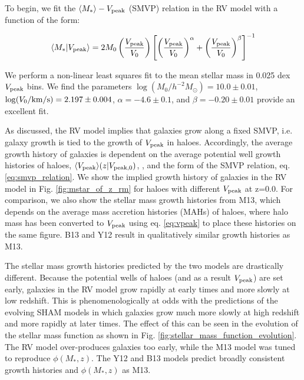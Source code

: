 \documentclass[a4paper,fleqn,usenatbib]{mnras}
\begin{document}
To begin, we fit the $\langle M_* \rangle - V_{\rm peak}$ (SMVP) relation in the RV model with a function of the form:
%
\begin{linenomath}
\begin{equation}
\label{eq:smvp_relation}
\langle M_* | V_{\rm peak} \rangle = 2M_0\left(\frac{V_{\rm peak}}{V_0}\right)\left[\left(\frac{V_{\rm peak}}{V_0}\right)^{\alpha}+\left(\frac{V_{\rm peak}}{V_0}\right)^{\beta}\right]^{-1}
\end{equation}
\end{linenomath}
%
We perform a non-linear least squares fit to the mean stellar mass in 0.025 dex $V_{\rm peak}$ bins.  We find the parameters $\log(M_0/h^{-2}M_{\odot})=10.0 \pm 0.01$, $\log(V_0/{\rm km/s})=2.197 \pm 0.004$, $\alpha=-4.6 \pm 0.1$, and $\beta=-0.20 \pm 0.01$ provide an excellent fit.

As discussed, the RV model implies that galaxies grow along a fixed SMVP, i.e. galaxy growth is tied to the growth of $V_{\rm peak}$ in haloes.  Accordingly, the average growth history of galaxies is dependent on the average potential well growth histories of haloes, $\langle V_{\rm peak} \rangle (z | V_{\rm peak, 0})$, \citep[PWGHs,][]{Bosch:2014cu}, and the form of the SMVP relation, eq. \ref{eq:smvp_relation}.  We show the implied growth history of galaxies in the RV model in Fig. \ref{fig:mstar_of_z_rm} for haloes with different $V_{\rm peak}$ at z=0.0.  For comparison, we also show the stellar mass growth histories from M13, which depends on the average mass accretion histories (MAHs) of haloes, where halo mass has been converted to $V_{\rm peak}$ using eq. \ref{eq:vpeak} to place these histories on the same figure.  B13 and Y12 result in qualitatively similar growth histories as M13.    

The stellar mass growth histories predicted by the two models are drastically different.  Because the potential wells of haloes (and as a result $V_{\rm peak}$) are set early, galaxies in the RV model grow rapidly at early times and more slowly at low redshift.  This is phenomenologically at odds with the predictions of the evolving SHAM models in which galaxies grow much more slowly at high redshift and more rapidly at later times.  The effect of this can be seen in the evolution of the stellar mass function as shown in Fig. \ref{fig:stellar_mass_function_evolution}.  The RV model over-produces galaxies too early, while the M13 model was tuned to reproduce $\phi(M_*,z)$.  The Y12 and B13 models predict broadly consistent growth histories and $\phi(M_*,z)$ as M13.
\end{document}
